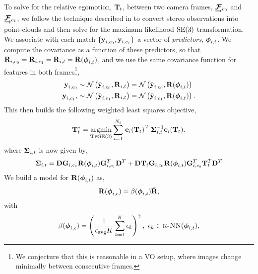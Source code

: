 To solve for the relative egomotion, $\boldsymbol{\mathbf{T}}_t$, between two camera frames, $\underrightarrow{ \boldsymbol{\mathbf{\mathcal{F}}} }_{c_0}$ and $\underrightarrow{ \boldsymbol{\mathbf{\mathcal{F}}} }_{c_1}$, we follow the technique described in  to convert stereo observations into point-clouds and then solve for the maximum likelihood $\mathrm{SE}(3)$ transformation. We associate with each match $\{\boldsymbol{\mathbf{y}}_{i, c_0}, \boldsymbol{\mathbf{y}}_{i, c_1}\}$ a vector of
\emph{predictors}, $\boldsymbol{\mathbf{\phi}}_{i,t}$. We compute the covariance as a function of these predictors, so
that $\boldsymbol{\mathbf{R}}_{i,c_0} =\boldsymbol{\mathbf{R}}_{i,c_1} = \boldsymbol{\mathbf{R}}_{i,t} = \boldsymbol{\mathbf{R}}( \boldsymbol{\mathbf{\phi}}_{i,t})$, and we use the same covariance function for features in both frames\footnote{We conjecture that this is reasonable in a VO setup, where images change minimally between consecutive frames.},
\begin{align}
	\boldsymbol{\mathbf{y}}_{i, c_0} &\sim \mathcal{N}\left(\bar{\boldsymbol{\mathbf{y}}}_{i,c_0}, \boldsymbol{\mathbf{R}}_{i,t} \right) = \mathcal{N}\left(\bar{\boldsymbol{\mathbf{y}}}_{i,c_0}, \boldsymbol{\mathbf{R}}( \boldsymbol{\mathbf{\phi}}_{i,t})\right) \\
		\boldsymbol{\mathbf{y}}_{i, c_1}, &\sim \mathcal{N}\left(\bar{\boldsymbol{\mathbf{y}}}_{i,c_1}, \boldsymbol{\mathbf{R}}_{i,t} \right) = \mathcal{N}\left(\bar{\boldsymbol{\mathbf{y}}}_{i,c_1}, \boldsymbol{\mathbf{R}}( \boldsymbol{\mathbf{\phi}}_{i,t})\right).
\end{align}
This then builds the following weighted least squares objective,
\begin{equation}
  \boldsymbol{\mathbf{T}}_t^* = \operatorname*{argmin}_{\boldsymbol{\mathbf{T}}\in\text{SE}(3)}\sum_{i=1}^{N_t} 
  \left.{\boldsymbol{\mathbf{e}}_{i}(\boldsymbol{\mathbf{T}}_t)}\right.^T \boldsymbol{\mathbf{\Sigma}}_{i,t}^{-1} \boldsymbol{\mathbf{e}}_{i}(\boldsymbol{\mathbf{T}}_t).
\end{equation}
where $\boldsymbol{\mathbf{\Sigma}}_{i,t}$ is now given by,
\begin{equation}
	\boldsymbol{\mathbf{\Sigma}}_{i,t} = \boldsymbol{\mathbf{D}}\boldsymbol{\mathbf{G}}_{i,c_1} \boldsymbol{\mathbf{R}}( \boldsymbol{\mathbf{\phi}}_{i,t})  \boldsymbol{\mathbf{G}}_{i,c_1}^T \boldsymbol{\mathbf{D}}^T + 
 \boldsymbol{\mathbf{D}}\boldsymbol{\mathbf{T}}_t \boldsymbol{\mathbf{G}}_{i,c_0} \boldsymbol{\mathbf{R}}( \boldsymbol{\mathbf{\phi}}_{i,t}) \boldsymbol{\mathbf{G}}_{i,c_0}^T  \boldsymbol{\mathbf{T}}_t^T \boldsymbol{\mathbf{D}}^T
\end{equation}
We build a model for $\boldsymbol{\mathbf{R}}( \boldsymbol{\mathbf{\phi}}_{i,t})$ as,
\begin{equation}
\boldsymbol{\mathbf{R}}( \boldsymbol{\mathbf{\phi}}_{i,c}) = \beta(\boldsymbol{\mathbf{\phi}}_{i,t}) \bar{\boldsymbol{\mathbf{R}}},
\end{equation}
with
\begin{equation}
 \beta(\boldsymbol{\mathbf{\phi}}_{i,c}) = \left(\frac{1}{\epsilon_\text{avg} K} \sum_{k=1}^K \epsilon_k  \right)^{\gamma}, ~ \epsilon_k \in \textsc{k-NN}(\boldsymbol{\mathbf{\phi}}_{i,t}),
\end{equation}

